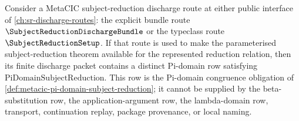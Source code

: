 \begin{proposition}\label{prop:metacic-pi-domain-setup-row-mandatory}
Consider a MetaCIC subject-reduction discharge route at either public interface of \autoref{ch:sr-discharge-routes}: the explicit bundle route $\SubjectReductionDischargeBundle$ or the typeclass route $\SubjectReductionSetup$. If that route is used to make the parameterised subject-reduction theorem available for the represented reduction relation, then its finite discharge packet contains a distinct Pi-domain row satisfying $\mathrm{PiDomainSubjectReduction}$. This row is the Pi-domain congruence obligation of \autoref{def:metacic-pi-domain-subject-reduction}; it cannot be supplied by the beta-substitution row, the application-argument row, the lambda-domain row, transport, continuation replay, package provenance, or local naming.
\end{proposition}
